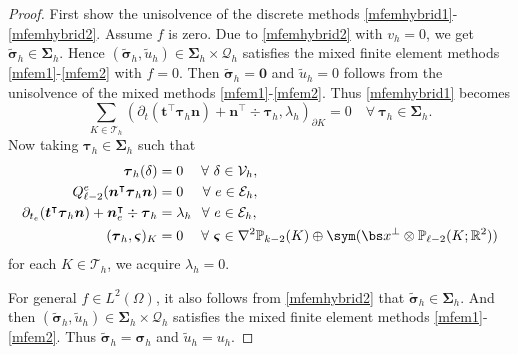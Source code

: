 \begin{proof}
First show the unisolvence of the discrete methods \eqref{mfemhybrid1}-\eqref{mfemhybrid2}. Assume $f$ is zero.
Due to \eqref{mfemhybrid2} with $v_h=0$, we get $\widetilde{\boldsymbol\sigma}_h\in\boldsymbol\Sigma_h$.
Hence $(\widetilde{\boldsymbol\sigma}_h, \widetilde{u}_h)\in\boldsymbol\Sigma_h\times\mathcal Q_h$ satisfies the mixed finite element methods \eqref{mfem1}-\eqref{mfem2} with $f=0$. Then $\widetilde{\boldsymbol\sigma}_h=\boldsymbol0$ and $\widetilde{u}_h=0$ follows from the unisolvence of the mixed methods \eqref{mfem1}-\eqref{mfem2}.  Thus \eqref{mfemhybrid1} becomes
\[
\sum_{K\in\mathcal T_h}(\partial_{t}(\boldsymbol  t^{\intercal}\boldsymbol \tau_h\boldsymbol  n)+\boldsymbol  n^{\intercal}\div\boldsymbol \tau_h,  \lambda_h)_{\partial K}=0\quad\forall~\boldsymbol\tau_h\in\boldsymbol\Sigma_h.
\]
Now taking $\boldsymbol{\tau}_h\in\boldsymbol\Sigma_h$ such that
\begin{align*}
\boldsymbol \tau_h (\delta)&=0  \quad\;\forall~\delta\in \mathcal V_h, \\
Q_{\ell-2}^e(\boldsymbol  n^{\intercal}\boldsymbol \tau_h\boldsymbol n)&=0  \;\;\;\;\;\forall~ e\in\mathcal E_h, \\
\partial_{t_e}(\boldsymbol  t^{\intercal}\boldsymbol \tau_h\boldsymbol  n)+\boldsymbol n_e^{\intercal}\div\boldsymbol \tau_h&=\lambda_h  \;\;\,\forall~ e\in\mathcal E_h, \\
(\boldsymbol \tau_h, \boldsymbol \varsigma)_K&=0  \quad\;\forall~\boldsymbol \varsigma\in\nabla^2\mathbb P_{k-2}(K)\oplus\sym (\bs x^{\perp}\otimes \mathbb P_{\ell-2}(K;\mathbb R^2))
\end{align*}
for each $K\in\mathcal T_h$, we acquire $\lambda_h=0$.

For general $f\in L^2(\Omega)$, it also follows from \eqref{mfemhybrid2} that $\widetilde{\boldsymbol\sigma}_h\in\boldsymbol\Sigma_h$. And then $(\widetilde{\boldsymbol\sigma}_h, \widetilde{u}_h)\in\boldsymbol\Sigma_h\times\mathcal Q_h$ satisfies the mixed finite element methods \eqref{mfem1}-\eqref{mfem2}. Thus $\widetilde{\boldsymbol\sigma}_h=\boldsymbol \sigma_h$ and $\widetilde{u}_h=u_h$.
\end{proof}

